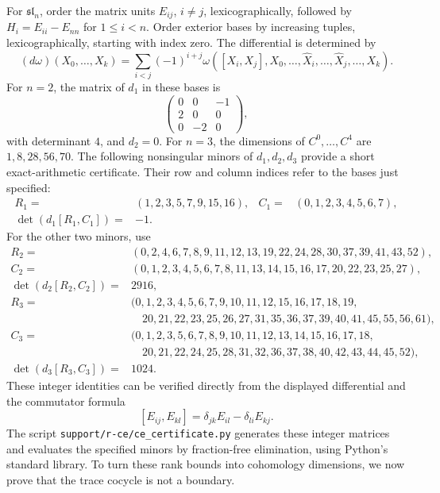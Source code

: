 \documentclass[11pt]{article}
\numberwithin{equation}{section}
\theoremstyle{definition}
\theoremstyle{remark}
\begin{document}
For $\mathfrak{sl}_n$, order the matrix units $E_{ij}$, $i\ne j$,
lexicographically, followed by $H_i=E_{ii}-E_{nn}$ for $1\le i<n$.
Order exterior bases by increasing tuples, lexicographically, starting
with index zero.  The differential is determined by
\[
 (d\omega)(X_0,\ldots,X_k)=
 \sum_{i<j}(-1)^{i+j}
 \omega([X_i,X_j],X_0,\ldots,\widehat X_i,\ldots,
                         \widehat X_j,\ldots,X_k).
\]
For $n=2$, the matrix of $d_1$ in these bases is
\[
 \begin{pmatrix}0&0&-1\\2&0&0\\0&-2&0\end{pmatrix},
\]
with determinant $4$, and $d_2=0$.  For $n=3$, the dimensions of
$C^0,\ldots,C^4$ are $1,8,28,56,70$.  The following nonsingular
minors of $d_1,d_2,d_3$ provide a short exact-arithmetic certificate.
Their row and column indices refer to the bases just specified:
\begin{align*}
 R_1={}&(1,2,3,5,7,9,15,16),&
 C_1={}&(0,1,2,3,4,5,6,7),\\
 \det(d_1[R_1,C_1])={}&-1.&&
\end{align*}
For the other two minors, use
\begin{align*}
 R_2={}&(0,2,4,6,7,8,9,11,12,13,19,22,24,28,30,37,39,41,43,52),\\
 C_2={}&(0,1,2,3,4,5,6,7,8,11,13,14,15,16,17,20,22,23,25,27),\\
 \det(d_2[R_2,C_2])={}&2916,
\end{align*}
\begin{align*}
 R_3={}&(0,1,2,3,4,5,6,7,9,10,11,12,15,16,17,18,19,\\
       &\hspace{1em}20,21,22,23,25,26,27,31,35,36,37,39,40,41,45,55,56,61),\\
 C_3={}&(0,1,2,3,5,6,7,8,9,10,11,12,13,14,15,16,17,18,\\
       &\hspace{1em}20,21,22,24,25,28,31,32,36,37,38,40,42,43,44,45,52),\\
 \det(d_3[R_3,C_3])={}&1024.
\end{align*}
These integer identities can be verified directly from the displayed
differential and the commutator formula
\[
 [E_{ij},E_{kl}]=\delta_{jk}E_{il}-\delta_{li}E_{kj}.
\]
The script \texttt{support/r-ce/ce\_certificate.py} generates these
integer matrices and evaluates the specified minors by fraction-free
elimination, using Python's standard library. To turn these rank bounds
into cohomology dimensions, we now prove that the trace cocycle is not
a boundary.
\end{document}
